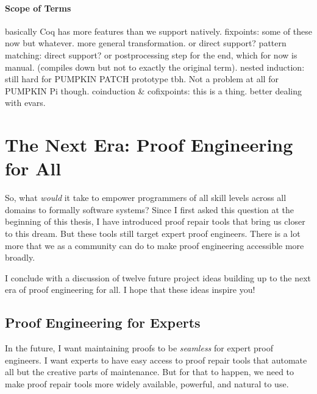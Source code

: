 \paragraph{Scope of Terms}
basically Coq has more features than we support natively. fixpoints: some of these now but whatever. more general transformation. or direct support? 
pattern matching: direct support? or postprocessing step for the end, which for now is manual. (compiles down but not to exactly the original term).
nested induction: still hard for PUMPKIN PATCH prototype tbh. Not a problem at all for PUMPKIN Pi though.
coinduction \& cofixpoints: this is a thing. 
better dealing with evars.

\section{The Next Era: Proof Engineering for All}
\label{sec:forall}



So, what \textit{would} it take to empower programmers of all skill levels across all domains to formally  software systems?
Since I first asked this question at the beginning of this thesis, I have introduced proof repair tools that bring us closer to this dream.
But these tools still target expert proof engineers.
There is a lot more that we as a community can do to make proof engineering accessible more broadly.

I conclude with a discussion of twelve future project ideas building up to the next era of proof engineering for all.
I hope that these ideas inspire you!

\subsection*{Proof Engineering for Experts}

In the future, I want maintaining proofs to be \emph{seamless} for expert proof engineers.
I want experts to have easy access to proof repair tools that automate all but the creative parts of maintenance.
But for that to happen, we need to make proof repair tools more widely available, powerful, and natural to use.

